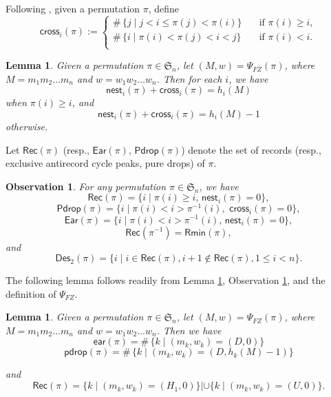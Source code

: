 \documentclass[12pt]{article}
\numberwithin{equation}{section}
\theoremstyle{plain}
\newtheorem{observation}[theorem]{Observation}
\newtheorem{lemma}[theorem]{Lemma}
\def\Rec{\mathsf{Rec}}
\def\ear{\mathsf{ear}}
\def\cross{\mathsf{cross}}
\def\Ear{\mathsf{Ear}}
\def\pdrop{\mathsf{pdrop}}
\def\Des{\mathsf{Des}}
\def\nest{\mathsf{nest}}
\def\Rmin{\mathsf{Rmin}}
\def\Pdrop{\mathsf{Pdrop}}
\begin{document}
    Following \cite{Corteel2007},  given a permutation $\pi$, define
     $$
     \cross_i(\pi):=	\begin{cases}
     	\#\,\{j\mid j<i\leq \pi(j)<\pi(i)\}&\quad \text{if $\pi(i)\geq i$},\\
     	\#\,\{i\mid \pi(i)<\pi(j)< i<j \}&\quad \text{if $\pi(i)<i$}.\\ 
     \end{cases}
     $$
     
     \begin{lemma}\label{lem-Cor}  
     		Given a permutation $\pi\in \mathfrak{S}_n$,  let  $(M,w)=\Psi_{FZ}(\pi)$,  where  $M=m_1m_2\ldots m_n$ and $w=w_1w_2\ldots w_n$. Then  for each $i$, 
     		we have  
     	$$
     	\nest_i(\pi)+\cross_i(\pi)=h_i(M)
     	$$
     	when $\pi(i)\geq i$, 
     	and  
     		$$
     	\nest_i(\pi)+\cross_i(\pi)=h_i(M)-1
     	$$
     	otherwise.
     	\end{lemma}
     Let $\Rec(\pi)$  (resp., $\Ear(\pi)$, $\Pdrop(\pi)$) denote the set of records  (resp., exclusive antirecord cycle peaks, pure drops) of $\pi$. 
      \begin{observation}\label{ob0}
     	For any permutation $\pi\in \mathfrak{S}_n$, we have 
     	$$
     	\Rec(\pi)=\{i\mid \pi(i)\geq i,\, \nest_i(\pi)=0\},
     	$$
     	$$
     	\Pdrop(\pi)=\{i\mid \pi(i)<i>\pi^{-1}(i), \,\, \cross_i(\pi)=0\},
     	$$
     	$$
     	\Ear(\pi)=\{i\mid \pi(i)<i>\pi^{-1}(i), \,\nest_i(\pi)=0\},
     	$$
     	$$
     	\Rec(\pi^{-1})=\Rmin(\pi),
     	$$
     	and 
     	$$
     	\Des_2(\pi)=\{i\mid i\in \Rec(\pi), i+1\notin \Rec(\pi), 1\leq i<n\}. 
     	$$
     \end{observation}
     
      
     
     
     
     The following lemma follows readily from Lemma \ref{lem-Cor}, Observation \ref{ob0}, and the definition of $\Psi_{FZ}$.
     \begin{lemma}\label{lem-PsiFZ}
     	Given a  permutation $\pi\in \mathfrak{S}_n$,  let  $(M,w)=\Psi_{FZ}(\pi)$,  where  $M=m_1m_2\ldots m_n$ and $w=w_1w_2\ldots w_n$. Then  we have
     	\begin{equation}\label{eq-ear-Mot}
     		\ear(\pi)=\#\,\{k\mid (m_k, w_k)=(D, 0)\}
     	\end{equation}
     	\begin{equation}\label{eq-pdrop-Mot}
     		\pdrop(\pi)=\#\,\{k\mid (m_k, w_k)=(D, h_k(M)-1)\}
     	\end{equation}
     	
     	and 
     	\begin{equation}\label{eq-Rec-Mot}
     		\Rec(\pi)=\{k\mid (m_k, w_k)=(H_1, 0)\}| \cup\{k\mid (m_k, w_k)=(U, 0)\}.
     	\end{equation}
     \end{lemma}
     
\end{document}

